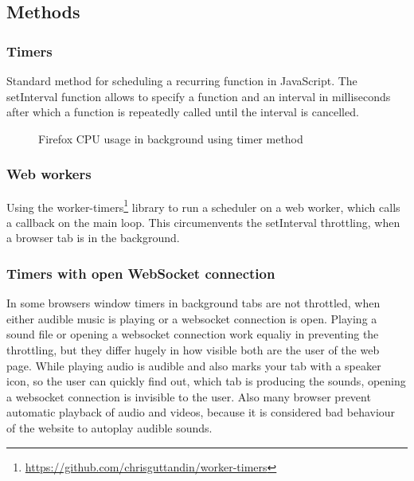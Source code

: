 \documentclass[article,type=bsc,colorback,accentcolor=tud9c]{tudthesis}
\begin{document}
  \subsection{Methods}

  
  \subsubsection{Timers}

  Standard method for scheduling a recurring function in JavaScript. The setInterval function allows to specify a function and an interval in milliseconds after which a function is repeatedly called until the interval is cancelled.

  \begin{figure}
	\begin{center}
		
	\end{center}
	\caption{Firefox CPU usage in background using timer method}
  \end{figure}
  
  \subsubsection{Web workers}
  
  Using the worker-timers\footnote{\url{https://github.com/chrisguttandin/worker-timers}} library to run a scheduler on a web worker, which calls a callback on the main loop. This circumenvents the setInterval throttling, when a browser tab is in the background.

  \subsubsection{Timers with open WebSocket connection}

  In some browsers window timers in background tabs are not throttled, when either audible music is playing or a websocket connection is open. Playing a sound file or opening a websocket connection work equaliy in preventing the throttling, but they differ hugely in how visible both are the user of the web page. While playing audio is audible and also marks your tab with a speaker icon, so the user can quickly find out, which tab is producing the sounds, opening a websocket connection is invisible to the user. Also many browser prevent automatic playback of audio and videos, because it is considered bad behaviour of the website to autoplay audible sounds.
\end{document}
